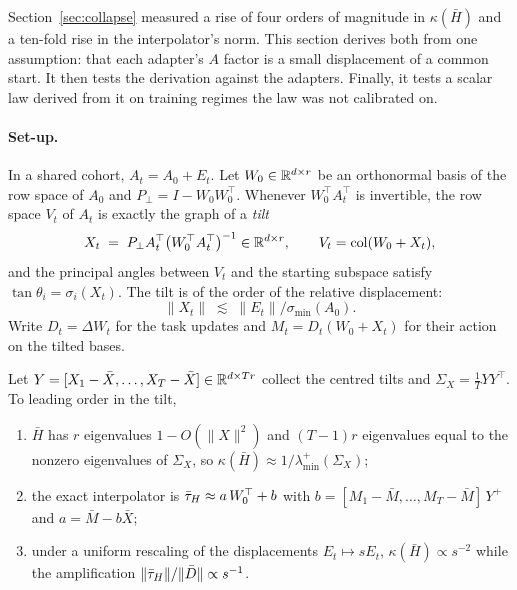 Section~\ref{sec:collapse} measured a rise of four orders of magnitude in
$\kappa(\bar H)$ and a ten-fold rise in the interpolator's norm. This section
derives both from one assumption: that each adapter's $A$ factor is a small
displacement of a common start. It then tests the derivation against the
adapters. Finally, it tests a scalar law derived from it on training regimes
the law was not calibrated on.

\paragraph{Set-up.} In a shared cohort, $A_t = A_0 + E_t$. Let
$W_0 \in \mathbb{R}^{d\times r}$ be an orthonormal basis of the row space of $A_0$ and
$P_\perp = I - W_0 W_0^\top$. Whenever $W_0^\top A_t^\top$ is invertible, the
row space $V_t$ of $A_t$ is exactly the graph of a \emph{tilt}
\begin{equation}\label{eq:tilt}
  X_t \;=\; P_\perp A_t^\top \bigl(W_0^\top A_t^\top\bigr)^{-1} \in \mathbb{R}^{d\times r},
  \qquad V_t = \operatorname{col}(W_0 + X_t),
\end{equation}
and the principal angles between $V_t$ and the starting subspace satisfy
$\tan\theta_i = \sigma_i(X_t)$. The tilt is of the order of the relative
displacement:
\[
  \|X_t\| \;\lesssim\; \|E_t\| / \sigma_{\min}(A_0).
\]
Write $D_t = \Delta W_t$ for the task updates and $M_t = D_t(W_0 + X_t)$ for
their action on the tilted bases.

\begin{proposition}
\label{prop:drift}
Let $Y = [X_1 - \bar X, \dots, X_T - \bar X] \in \mathbb{R}^{d\times Tr}$ collect the
centred tilts and $\Sigma_X = \tfrac1T Y Y^\top$. To leading order in the tilt,
\begin{enumerate}[leftmargin=*,itemsep=1pt,topsep=2pt]
\item $\bar H$ has $r$ eigenvalues $1 - O(\|X\|^2)$ and $(T-1)r$ eigenvalues
  equal to the nonzero eigenvalues of $\Sigma_X$, so
  $\kappa(\bar H) \approx 1/\lambda_{\min}^{+}(\Sigma_X)$;
\item the exact interpolator is $\bar{\tau}_H \approx a\,W_0^\top + b$ with
  $b = [M_1 - \bar M, \dots, M_T - \bar M]\, Y^{+}$ and $a = \bar M - b\bar X$;
\item under a uniform rescaling of the displacements $E_t \mapsto sE_t$,
  $\kappa(\bar H) \propto s^{-2}$ while the amplification
  $\|\bar{\tau}_H\|/\|\bar D\| \propto s^{-1}$.
\end{enumerate}
\end{proposition}


